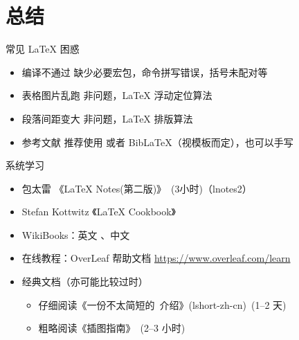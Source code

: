 
\section{总结}

\begin{frame}{常见 \LaTeX{} 困惑}
  \begin{itemize}
    \item \alert{编译不通过} 缺少必要宏包，命令拼写错误，括号未配对等
    \item \alert{表格图片乱跑} 非问题，\LaTeX{} 浮动定位算法 
    \item \alert{段落间距变大} 非问题，\LaTeX{} 排版算法
    \item \alert{参考文献} 推荐使用 \BibTeX 或者 Bib\LaTeX（视模板而定），也可以手写  
  \end{itemize}
\end{frame}

\begin{frame}{系统学习}
  \begin{itemize}
      \item 包太雷 《\LaTeX{} Notes(第二版)》~(3小时)（lnotes2） 
      \item Stefan Kottwitz 《LaTeX Cookbook》
      \item WikiBooks：英文 、中文 
      \item 在线教程：OverLeaf 帮助文档 \url{https://www.overleaf.com/learn}
      \item 经典文档（亦可能比较过时）
        \begin{itemize}
          \item 仔细阅读《一份不太简短的~\LaTeXe 介绍》(lshort-zh-cn)~(1--2 天)
          \item 粗略阅读《\LaTeXe 插图指南》~(2--3 小时)
        \end{itemize}
  \end{itemize}
\end{frame}

